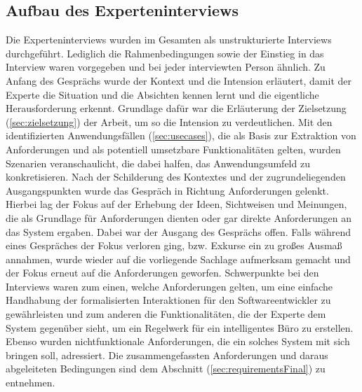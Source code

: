 \subsection{Aufbau des Experteninterviews}
    Die Experteninterviews wurden im Gesamten als unstrukturierte Interviews durchgeführt. Lediglich die Rahmenbedingungen sowie 
    der Einstieg in das Interview waren vorgegeben und bei jeder interviewten Person ähnlich. Zu Anfang des Gesprächs wurde 
    der Kontext und die Intension erläutert, damit der Experte die Situation und die Absichten kennen lernt und die 
    eigentliche Herausforderung %
    erkennt. Grundlage dafür war die Erläuterung der Zielsetzung (\ref{sec:zielsetzung}) der Arbeit, 
    um so die Intension zu verdeutlichen. Mit den identifizierten Anwendungsfällen (\ref{sec:usecases}), die als Basis 
    zur Extraktion von Anforderungen und als potentiell umsetzbare Funktionalitäten gelten, wurden Szenarien veranschaulicht, 
    die dabei halfen, das Anwendungsumfeld zu konkretisieren.  
    Nach der Schilderung des Kontextes und der zugrundeliegenden Ausgangspunkten wurde das Gespräch in Richtung Anforderungen 
    gelenkt. Hierbei lag der Fokus auf der Erhebung der Ideen, Sichtweisen und Meinungen, die als Grundlage für Anforderungen 
    dienten oder gar direkte Anforderungen an das System ergaben. Dabei war der Ausgang des Gesprächs offen. Falls während 
    eines Gespräches der Fokus verloren ging, bzw. Exkurse ein zu großes Ausmaß annahmen, wurde wieder auf die 
    vorliegende Sachlage aufmerksam gemacht und der Fokus erneut auf die Anforderungen geworfen. 
    Schwerpunkte bei den Interviews waren zum einen, welche Anforderungen gelten, um eine einfache Handhabung der 
    formalisierten Interaktionen für den Softwareentwickler zu gewährleisten und zum anderen die Funktionalitäten, die der 
    Experte dem System gegenüber sieht, um ein Regelwerk für ein intelligentes Büro zu erstellen. 
    Ebenso wurden nichtfunktionale Anforderungen, die ein solches System mit sich bringen soll, adressiert. 
    Die zusammengefassten Anforderungen und daraus abgeleiteten Bedingungen sind dem Abschnitt (\ref{sec:requirementsFinal}) 
    zu entnehmen.
     
